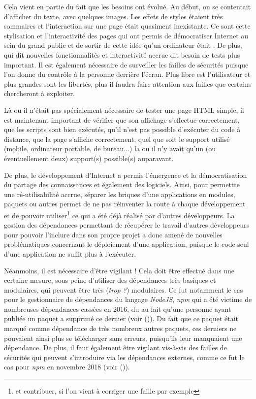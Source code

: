 Cela vient en partie du fait que les besoins ont évolué. Au début, on se contentait d'afficher du texte, avec quelques images. Les effets de styles étaient très sommaires et l'interaction sur une page était quasiment inexistante. Ce sont cette stylisation et l'interactivité des pages qui ont permis de démocratiser Internet au sein du grand public et de sortir de cette idée qu'un ordinateur était . De plus, qui dit nouvelles fonctionnalités et interactivité accrue dit besoin de tests plus important. Il est également nécessaire de surveiller les failles de sécurités puisque l'on donne du contrôle à la personne derrière l'écran. Plus libre est l'utilisateur et plus grandes sont les libertés, plus il faudra faire attention aux failles que certains chercheront à exploiter.

Là ou il n'était pas spécialement nécessaire de tester une page \gls{HTML} simple, il est maintenant important de vérifier que son affichage s'effectue correctement, que les scripts sont bien exécutés, qu'il n'est pas possible d'exécuter du code à distance, que la page s'affiche correctement, quel que soit le support utilisé (mobile, ordinateur portable, de bureau...) la ou il n'y avait qu'un (ou éventuellement deux) support(s) possible(s) auparavant. 

De plus, le développement d'Internet a permis l'émergence et la démocratisation du partage des connaissances et également des logiciels. Ainsi, pour permettre une ré-utilisabilité accrue, séparer les briques d'une applications en modules, paquets ou autres permet de ne pas réinventer la route à chaque développement et de pouvoir utiliser\footnote{et contribuer, si l'on vient à corriger une faille par exemple} ce qui a été déjà réalisé par d'autres développeurs. La gestion des dépendances permettant de récupérer le travail d'autres développeurs pour pouvoir l'inclure dans son propre projet a donc amené de nouvelles problématiques concernant le déploiement d'une application, puisque le code seul d'une application ne suffit plus à l'exécuter. 

Néanmoins, il est nécessaire d'être vigilant ! Cela doit être effectué dans une certaine mesure, sous peine d'utiliser des dépendances très basiques et modulaires, qui peuvent être très (\emph{trop ?}) modulaires. Ce fut notamment le cas pour le gestionnaire de dépendances du langage \emph{NodeJS}, \emph{npm} qui a été victime de nombreuses dépendances cassées en 2016, du au fait qu'une personne ayant publiée un paquet a supprimé ce dernier (voir  \cite{npm-missing-deps} ()). Du fait que ce paquet était marqué comme dépendance de très nombreux autres paquets, ces derniers ne pouvaient ainsi plus se télécharger sans erreurs, puisqu'ils leur manquaient une dépendance. De plus, il faut également être vigilant vis-à-vis des failles de sécurités qui peuvent s'introduire via les dépendances externes, comme ce fut le cas pour \emph{npm} en novembre 2018 (voir  \cite{npm-faille} ()).

